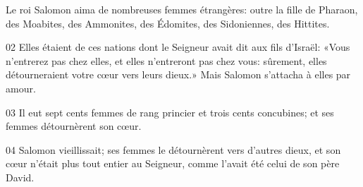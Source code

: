 Le roi Salomon aima de nombreuses femmes étrangères: outre la fille de Pharaon, des Moabites, des Ammonites, des Édomites, des Sidoniennes, des Hittites.

02 Elles étaient de ces nations dont le Seigneur avait dit aux fils d’Israël: «Vous n’entrerez pas chez elles, et elles n’entreront pas chez vous: sûrement, elles détourneraient votre cœur vers leurs dieux.» Mais Salomon s’attacha à elles par amour.

03 Il eut sept cents femmes de rang princier et trois cents concubines; et ses femmes détournèrent son cœur.

04 Salomon vieillissait; ses femmes le détournèrent vers d’autres dieux, et son cœur n’était plus tout entier au Seigneur, comme l’avait été celui de son père David.

